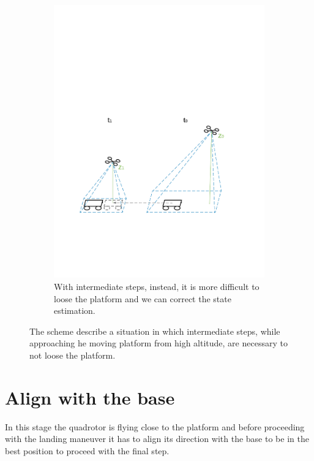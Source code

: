 \begin{figure}[!htbp] \ContinuedFloat  
   \begin{subfigure}[b]{0.8\textwidth}
     \includegraphics[width=\textwidth]{img/approach_platform.pdf}
        \caption{With intermediate steps, instead, it is more difficult to loose the platform and we can correct the state estimation.}
        \label{fig:not_loose_platform}
   \end{subfigure}
    \caption{The scheme describe a situation in which intermediate steps, while approaching he moving platform from high altitude, are necessary to not loose the platform.  }
    \label{fig:approach_platform}
\end{figure}
 
\section{Align with the base}
In this stage the quadrotor is flying close to the platform and before proceeding with the landing maneuver it has to align its direction with the base to be in the best position to proceed with the final step.\\

